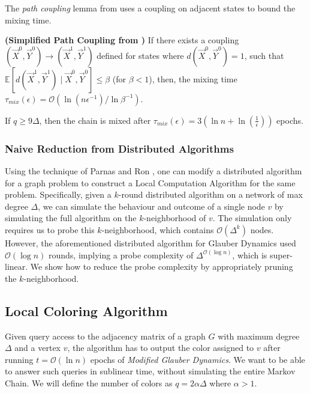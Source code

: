 The \emph{path coupling} lemma from \cite{path_coupling} uses a coupling on adjacent states to bound the mixing time.
\begin{lemma}
\label{lem:path_coupling}
\textbf{(Simplified Path Coupling from \cite{path_coupling})}
If there exists a coupling $(\vec X^0,\vec Y^0)\rightarrow(\vec X^1,\vec Y^1)$ defined for states where $d(\vec X^0, \vec Y^0) = 1$,
such that $\mathbb{E}[d(\vec X^1, \vec Y^1) \mid \vec X^0, \vec Y^0] \le \beta$ (for $\beta < 1$),
then, the mixing time $\tau_{mix}(\epsilon) = \mathcal O(\ln (n\epsilon^{-1})/\ln \beta^{-1})$.
\end{lemma}

\begin{corollary}
\label{cor:modified_mixing_time}
If $q\ge 9\Delta$, then the chain is mixed after $\tau_{mix}(\epsilon) = 3\left( \ln n + \ln(\frac1{\epsilon})\right)$ epochs.
\end{corollary}
\subsubsection{Naive Reduction from Distributed Algorithms}
\label{sec:naive_reduction_from_distributed_algorithms}
Using the technique of Parnas and Ron \cite{parnas_ron},
one can modify a distributed algorithm for a graph problem to construct a Local Computation Algorithm for the same problem.
Specifically, given a $k$-round distributed algorithm on a network of max degree $\Delta$,
we can simulate the behaviour and outcome of a single node $v$ by simulating the full algorithm on the $k$-neighborhood of $v$.
The simulation only requires us to probe this $k$-neighborhood, which contains $\mathcal O(\Delta^k)$ nodes.
However, the aforementioned distributed algorithm for Glauber Dynamics used $\mathcal O(\log n)$ rounds,
implying a probe complexity of $\Delta^{\mathcal O(\log n)}$, which is super-linear.
We show how to reduce the probe complexity by appropriately pruning the $k$-neighborhood.



\subsection{Local Coloring Algorithm}%
\label{sec:local_coloring_algortihm}
Given query access to the adjacency matrix of a graph $G$ with maximum degree $\Delta$ and a vertex $v$,
the algorithm has to output the color assigned to $v$ after running $t = \mathcal O(\ln n)$ epochs of \emph{Modified Glauber Dynamics}.
We want to be able to answer such queries in sublinear time, without simulating the entire Markov Chain.
We will define the number of colors as $q = 2\alpha\Delta$ where $\alpha > 1$.


